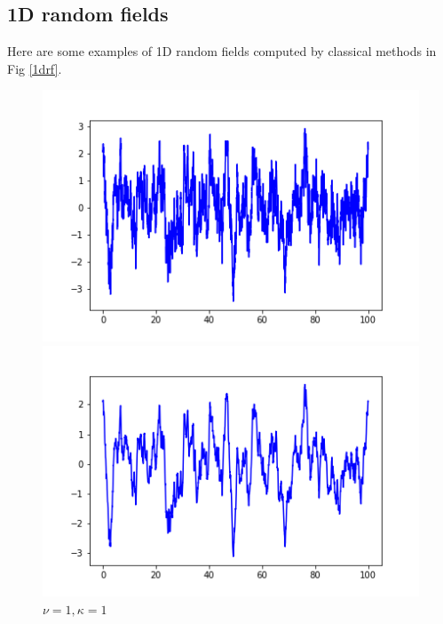 \documentclass{article}
\begin{document}
\subsection{1D random fields}
Here are some examples of 1D random fields computed by classical methods in Fig \ref{1drf}.
\begin{figure}[H]
    \centering
\begin{minipage}[t]{0.3\textwidth}  %
    \centering
    \includegraphics[width=\textwidth]{./pics/1D_RF_4096_100.0_0.5_1.png}  %
    \caption*{$\nu = 0.5, \kappa = 1$}
  \end{minipage}
  \begin{minipage}[t]{0.3\textwidth} 
    \centering
    \includegraphics[width=\textwidth]{./pics/1D_RF_4096_100.0_1_1.png} 
    \caption*{$\nu = 1, \kappa = 1$}
  \end{minipage}

\end{figure}
\end{document}
